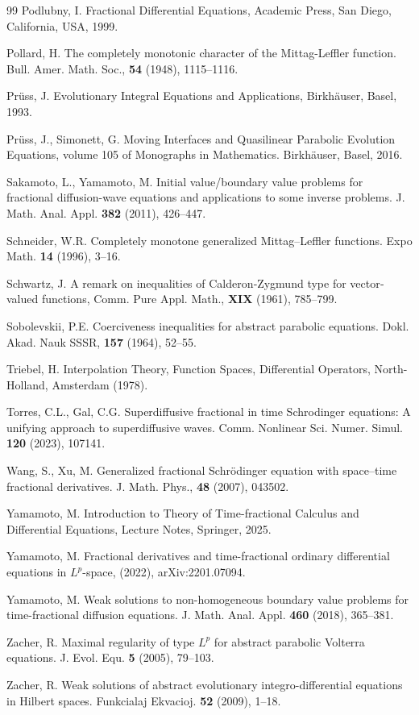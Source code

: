 \documentclass[reqno]{amsart}
\numberwithin{equation}{section}
\begin{document}
\begin{thebibliography}{99}
Podlubny, I. Fractional Differential Equations, Academic Press, San Diego, California, USA, 1999.

Pollard, H. The completely monotonic character of the Mittag-Leffler function. Bull. Amer. Math. Soc., \textbf{54} (1948), 1115–1116.

Pr\"uss, J. Evolutionary Integral Equations and Applications, Birkh\"auser, Basel, 1993.

Prüss, J., Simonett, G. Moving Interfaces and Quasilinear Parabolic Evolution
Equations, volume 105 of Monographs in Mathematics. Birkhäuser, Basel, 2016.

Sakamoto, L., Yamamoto, M. Initial value/boundary value problems for fractional diffusion-wave equations and applications to some inverse problems. J. Math. Anal. Appl. \textbf{382} (2011), 426–447.

Schneider, W.R. Completely monotone generalized Mittag–Leffler functions. Expo Math. \textbf{14} (1996), 3–16.

Schwartz, J. A remark on inequalities of Calderon‐Zygmund type for vector‐valued functions,
Comm. Pure Appl. Math., \textbf{XIX} (1961), 785–799.

Sobolevskii, P.E. Coerciveness inequalities for abstract parabolic equations. Dokl. Akad. Nauk SSSR, \textbf{157} (1964), 52–55.

Triebel, H. Interpolation Theory, Function Spaces, Differential Operators, North-Holland, Amsterdam (1978).

Torres, C.L., Gal, C.G. Superdiffusive fractional in time Schrodinger equations: A unifying approach to superdiffusive waves. Comm. Nonlinear Sci. Numer. Simul. \textbf{120} (2023), 107141.

Wang, S., Xu, M. Generalized fractional Schrödinger equation with space–time fractional derivatives. J. Math. Phys., \textbf{48} (2007), 043502.

Yamamoto, M. Introduction to Theory of Time-fractional Calculus and Differential Equations, Lecture Notes, Springer, 2025.

Yamamoto, M. Fractional derivatives and time-fractional ordinary differential equations in $L^p$-space, (2022), arXiv:2201.07094.

Yamamoto, M. Weak solutions to non-homogeneous boundary value problems for time-fractional diffusion equations. J. Math. Anal. Appl. \textbf{460} (2018), 365–381.

Zacher, R. Maximal regularity of type $L^p$ for abstract parabolic Volterra equations. J. Evol. Equ. \textbf{5} (2005), 79–103.

Zacher, R. Weak solutions of abstract evolutionary integro-differential equations in Hilbert spaces. Funkcialaj Ekvacioj. {\bf 52} (2009), 1–18.

\end{thebibliography}
\end{document}

